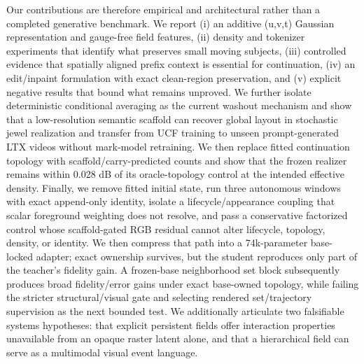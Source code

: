\documentclass[10pt]{article}
\newcommand{\uvt}{(u,v,t)}
\begin{document}
Our contributions are therefore empirical and architectural rather than a completed generative
benchmark. We report (i) an additive \uvt{} Gaussian representation and gauge-free field features,
(ii) density and tokenizer experiments that identify what preserves small moving subjects,
(iii) controlled evidence that spatially aligned prefix context is essential for continuation,
(iv) an edit/inpaint formulation with exact clean-region preservation, and (v) explicit negative
results that bound what remains unproved. We further isolate deterministic conditional averaging as
the current washout mechanism and show that a low-resolution semantic scaffold can recover global
layout in stochastic jewel realization and transfer from UCF training to unseen prompt-generated
LTX videos without mark-model retraining. We then replace fitted continuation topology with
scaffold/carry-predicted counts and show that the frozen realizer remains within 0.028 dB of its
oracle-topology control at the intended effective density. Finally, we remove fitted initial state,
run three autonomous windows with exact append-only identity, isolate a lifecycle/appearance
coupling that scalar foreground weighting does not resolve, and pass a conservative factorized
control whose scaffold-gated RGB residual cannot alter lifecycle, topology, density, or identity.
We then compress that path into a 74k-parameter base-locked adapter; exact ownership survives, but
the student reproduces only part of the teacher's fidelity gain. A frozen-base neighborhood set
block subsequently produces broad fidelity/error gains under exact base-owned topology, while
failing the stricter structural/visual gate and selecting rendered set/trajectory supervision as
the next bounded test. We additionally articulate two
falsifiable systems hypotheses: that explicit persistent fields offer interaction properties
unavailable from an opaque raster latent alone, and that a hierarchical field can serve as a
multimodal visual event language.
\end{document}
